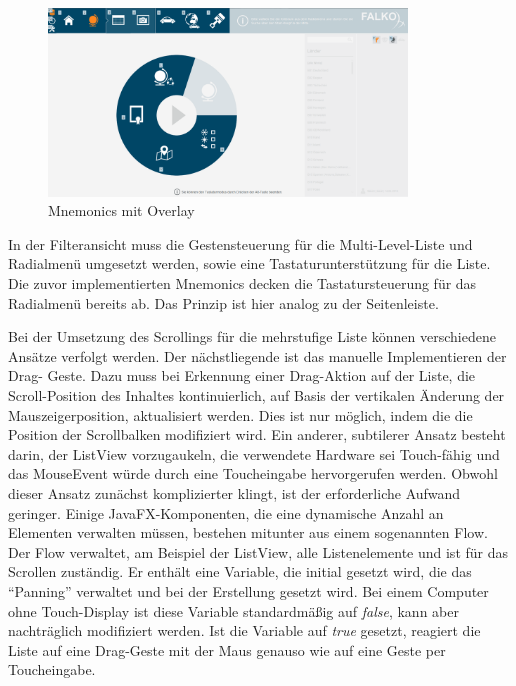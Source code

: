\begin{figure}[H]
 \centering
 \includegraphics[width=0.85\textwidth]{grafiken/mnemonics.png}
 \caption{Mnemonics mit Overlay}
 \label{fig:mnemonicsOverlay}
\end{figure}
In der Filteransicht muss die Gestensteuerung für die Multi-Level-Liste und Radialmenü umgesetzt werden, sowie eine Tastaturunterstützung für die Liste. Die zuvor implementierten Mnemonics decken die Tastatursteuerung für das Radialmenü bereits ab. Das Prinzip ist hier analog zu der Seitenleiste. \par
Bei der Umsetzung des Scrollings für die mehrstufige Liste können verschiedene Ansätze verfolgt werden. Der nächstliegende ist das manuelle Implementieren der Drag- Geste. Dazu muss bei Erkennung einer Drag-Aktion auf der Liste, die Scroll-Position des Inhaltes kontinuierlich, auf Basis der vertikalen Änderung der Mauszeigerposition, aktualisiert werden. Dies ist nur möglich, indem die die Position der Scrollbalken modifiziert wird. Ein anderer, subtilerer Ansatz besteht darin, der ListView vorzugaukeln, die verwendete Hardware sei Touch-fähig und das MouseEvent würde durch eine Toucheingabe hervorgerufen werden. Obwohl dieser Ansatz zunächst komplizierter klingt, ist der erforderliche Aufwand geringer. Einige JavaFX-Komponenten, die eine dynamische Anzahl an Elementen verwalten müssen, bestehen mitunter aus einem sogenannten Flow. Der Flow verwaltet, am Beispiel der ListView, alle Listenelemente und ist für das Scrollen zuständig. Er enthält eine Variable, die initial gesetzt wird, die das \enquote{Panning} verwaltet und bei der Erstellung gesetzt wird. Bei einem Computer ohne Touch-Display ist diese Variable standardmäßig auf \textit{false}, kann aber nachträglich modifiziert werden. Ist die Variable auf \textit{true} gesetzt, reagiert die Liste auf eine Drag-Geste mit der Maus genauso wie auf eine Geste per Toucheingabe.\par
